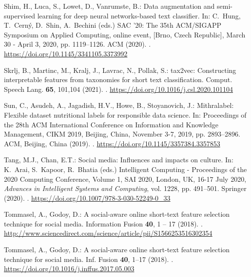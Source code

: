 \documentclass{article}
\begin{document}
\begin{thebibliography}{10}
Shim, H., Luca, S., Lowet, D., Vanrumste, B.: Data augmentation and
  semi-supervised learning for deep neural networks-based text classifier.
\newblock In: C.~Hung, T.~Cern{\'{y}}, D.~Shin, A.~Bechini (eds.) {SAC} '20:
  The 35th {ACM/SIGAPP} Symposium on Applied Computing, online event, [Brno,
  Czech Republic], March 30 - April 3, 2020, pp. 1119--1126. {ACM} (2020).
\newblock {}.
\newblock \urlprefix\url{https://doi.org/10.1145/3341105.3373992}

Skrlj, B., Martinc, M., Kralj, J., Lavrac, N., Pollak, S.: tax2vec:
  Constructing interpretable features from taxonomies for short text
  classification.
\newblock Comput. Speech Lang. \textbf{65}, 101,104 (2021).
\newblock {}.
\newblock \urlprefix\url{https://doi.org/10.1016/j.csl.2020.101104}

Sun, C., Asudeh, A., Jagadish, H.V., Howe, B., Stoyanovich, J.: Mithralabel:
  Flexible dataset nutritional labels for responsible data science.
\newblock In: Proceedings of the 28th {ACM} International Conference on
  Information and Knowledge Management, {CIKM} 2019, Beijing, China, November
  3-7, 2019, pp. 2893--2896. {ACM}, Beijing, China (2019).
\newblock {}.
\newblock \urlprefix\url{https://doi.org/10.1145/3357384.3357853}

Tang, M.J., Chan, E.T.: Social media: Influences and impacts on culture.
\newblock In: K.~Arai, S.~Kapoor, R.~Bhatia (eds.) Intelligent Computing -
  Proceedings of the 2020 Computing Conference, Volume 1, {SAI} 2020, London,
  UK, 16-17 July 2020, \emph{Advances in Intelligent Systems and Computing},
  vol. 1228, pp. 491--501. Springer (2020).
\newblock {}.
\newblock \urlprefix\url{https://doi.org/10.1007/978-3-030-52249-0\_33}

Tommasel, A., Godoy, D.: A social-aware online short-text feature selection
  technique for social media.
\newblock Information Fusion \textbf{40}, 1 -- 17 (2018).
\newblock {}.
\newblock
  \urlprefix\url{http://www.sciencedirect.com/science/article/pii/S1566253516302354}

Tommasel, A., Godoy, D.: A social-aware online short-text feature selection
  technique for social media.
\newblock Inf. Fusion \textbf{40}, 1--17 (2018).
\newblock {}.
\newblock \urlprefix\url{https://doi.org/10.1016/j.inffus.2017.05.003}


\end{thebibliography}
\end{document}
